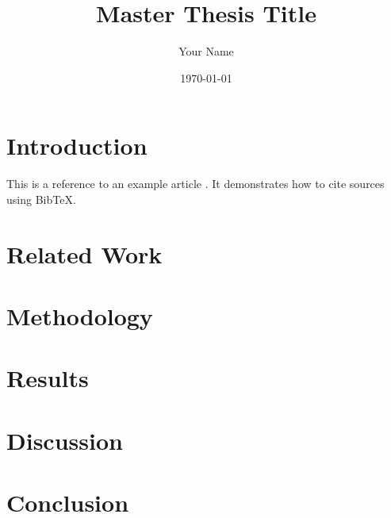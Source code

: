 \documentclass[a4paper, 12pt]{report}
\title{Master Thesis Title}
\author{Your Name}
\date{\today}
\begin{document}
\maketitle
\thispagestyle{empty}
\newpage

\begin{abstract}
    \lipsum[1-2] %
\end{abstract}

\newpage
\tableofcontents
\newpage

\chapter{Introduction}
This is a reference to an example article \cite{sample2024}. It demonstrates how to cite sources using BibTeX.

\lipsum[3-5] %

\chapter{Related Work}
\lipsum[6-8] %

\chapter{Methodology}
\lipsum[9-11] %

\chapter{Results}
\lipsum[12-14] %

\chapter{Discussion}
\lipsum[15-17] %

\chapter{Conclusion}
\lipsum[18-19] %

\newpage


\end{document}
